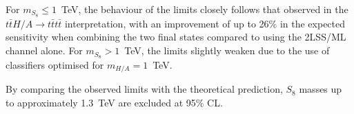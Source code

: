 For $m_{S_8} \leq 1$~TeV, the behaviour of the limits closely follows that observed in the $t\bar{t}H/A \rightarrow t\bar{t}t\bar{t}$ interpretation, 
with an improvement of up to 26\% in the expected sensitivity when combining the two final states compared to using the 2LSS/ML channel alone. 
For $m_{S_8} > 1$~TeV, the limits slightly weaken due to the use of classifiers optimised for $m_{H/A}=1$~TeV.

By comparing the observed limits with the theoretical prediction, 
$S_{8}$ masses up to approximately 1.3~TeV are excluded at 95\% CL.
